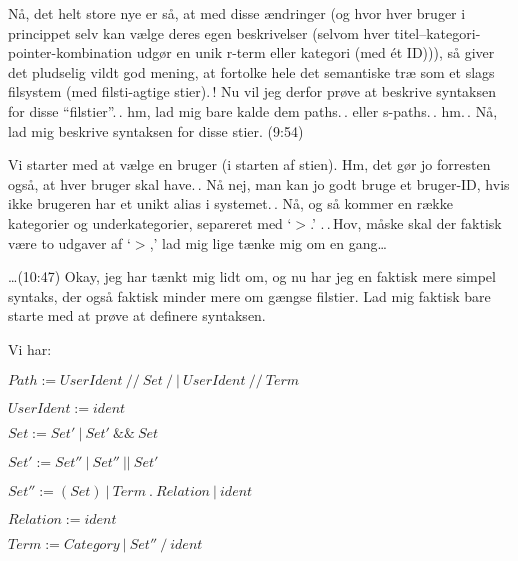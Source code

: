 \documentclass{report}
\begin{document}
Nå, det helt store nye er så, at med disse ændringer (og hvor hver bruger i princippet selv kan vælge deres egen beskrivelser (selvom hver titel--kategori-pointer-kombination udgør en unik r-term eller kategori (med ét ID))), så giver det pludselig vildt god mening, at fortolke hele det semantiske træ som et slags filsystem (med filsti-agtige stier).\,! Nu vil jeg derfor prøve at beskrive syntaksen for disse ``filstier''.\,. hm, lad mig bare kalde dem paths.\,. eller s-paths.\,. hm.\,. Nå, lad mig beskrive syntaksen for disse stier. (9:54)

Vi starter med at vælge en bruger (i starten af stien). Hm, det gør jo forresten også, at hver bruger skal have.\,. Nå nej, man kan jo godt bruge et bruger-ID, hvis ikke brugeren har et unikt alias i systemet.\,. Nå, og så kommer en række kategorier og underkategorier, separeret med `$>$.' .\,.\,Hov, måske skal der faktisk være to udgaver af `$>$,' lad mig lige tænke mig om en gang\ldots 

\ldots (10:47) Okay, jeg har tænkt mig lidt om, og nu har jeg en faktisk mere simpel syntaks, der også faktisk minder mere om gængse filstier. Lad mig faktisk bare starte med at prøve at definere syntaksen.

Vi har:

%
%
%
%
%
%
%
%

$Path := UserIdent\ \texttt{//}\ Set\ \texttt{/}\ |\ UserIdent\ \texttt{//}\ Term$

$UserIdent := ident$

$Set := Set'\ |\ Set'\ \texttt{\&\&}\ Set$ 

$Set' := Set''\ |\ Set''\ \texttt{||}\ Set'$ 

$Set'' := (Set)\ |\ Term\ \texttt{.}\ Relation\ |\ ident$ 

$Relation := ident$

$Term := Category\ |\ Set''\ \texttt{/}\ ident$

\end{document}
